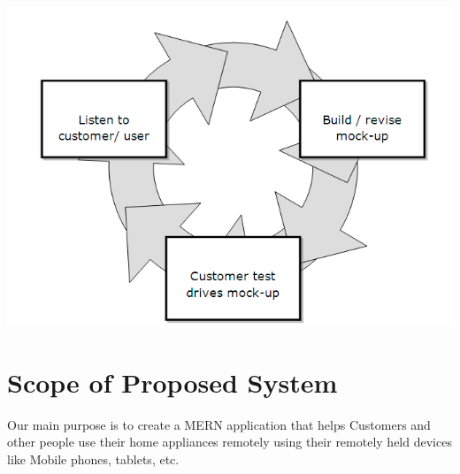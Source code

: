 
\includegraphics[scale=0.8]{Ch2/prototype.png}

\label{fig:Prototype Model}


\section{Scope of Proposed System}
Our main purpose is to create a MERN application that helps Customers and other people use their home appliances remotely using their remotely held devices like Mobile phones, tablets, etc.





